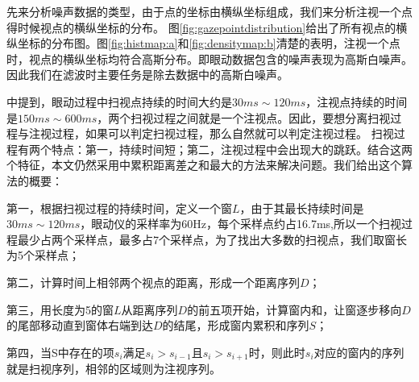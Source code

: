 先来分析噪声数据的类型，由于点的坐标由横纵坐标组成，我们来分析注视一个点得时候视点的横纵坐标的分布。
图\ref{fig:gazepointdistribution}给出了所有视点的横纵坐标的分布图。图\ref{fig:histmap:a}和\ref{fig:densitymap:b}清楚的表明，注视一个点时，视点的横纵坐标均符合高斯分布。即眼动数据包含的噪声表现为高斯白噪声。
因此我们在滤波时主要任务是除去数据中的高斯白噪声。
\begin{figure}[ht]
  \centering
\end{figure}
\parencite{duchowski2007eye}中提到，眼动过程中扫视点持续的时间大约是$30ms \sim 120ms$，注视点持续的时间是$150ms \sim 600ms$，两个扫视过程之间就是一个注视点。因此，要想分离扫视过程与注视过程，如果可以判定扫视过程，那么自然就可以判定注视过程。
扫视过程有两个特点：第一，持续时间短；第二，注视过程中会出现大的跳跃。结合这两个特征，本文仍然采用\parencite{olsson2007real}中累积距离差之和最大的方法来解决问题。我们给出这个算法的概要：

第一，根据扫视过程的持续时间，定义一个窗$L$，由于其最长持续时间是$30ms \sim 120ms$，眼动仪的采样率为60Hz，每个采样点约占16.7ms,所以一个扫视过程最少占两个采样点，最多占7个采样点，为了找出大多数的扫视点，我们取窗长为5个采样点；

第二，计算时间上相邻两个视点的距离，形成一个距离序列$D$；

第三，用长度为5的窗$L$从距离序列$D$的前五项开始，计算窗内和，让窗逐步移向$D$的尾部移动直到窗体右端到达$D$的结尾，形成窗内累积和序列$S$；

第四，当S中存在的项$s_i$满足$s_i>s_{i-1}$且$s_i>s_{i+1}$时，则此时$s_i$对应的窗内的序列就是扫视序列，相邻的区域则为注视序列。

